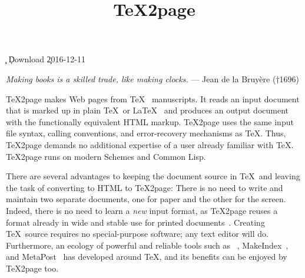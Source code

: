%




\ifx\TZPtitle\UnDeFiNeD
\def\TZPtitle{TeX2page}\fi

\title{\TeX2page}

\smallskip

\c{}
%
\ifx\inpltdist\Undefined
\ifx\shipout\UnDeFiNeD
\c{Download
}
\else
\c{2016-12-11} %
\fi
\fi
%


\ifx\shipout\UnDeFiNeD
\centerline{}
\fi

{\obeylines\raggedleft
\ifx\shipout\UnDeFiNeD\small\else\eightfont\fi
{\it Making books is a skilled trade,
like making clocks.}
— Jean de la Bruyère (†1696)
}


\medskip


\n
\TeX2page
makes Web pages
from \TeX~\cite{texbook} manuscripts.
It reads an
input document that is marked up in
plain \TeX\ or \LaTeX~\cite{latex}
and
produces an output document with the functionally
equivalent HTML markup.
\TeX2page uses the same input
file syntax, calling conventions, and  error-recovery
mechanisms as \TeX.  Thus, \TeX2page demands no additional
expertise of a user already familiar with \TeX.
\TeX2page runs on modern Schemes and Common Lisp.

There are several advantages to keeping the document
source in \TeX\ and leaving the task of converting to
HTML to \TeX2page:  There is no need to write and
maintain two separate documents, one for paper and the
other for the screen.  Indeed, there is no need to
learn a {\em new} input format, as \TeX2page reuses a
format already in wide and stable use for printed
documents~\cite{tug,ctan}.  Creating \TeX\
source requires no special-purpose software; any text
editor will do.  Furthermore, an ecology of powerful and
reliable tools such as \BibTeX~\cite{bibtex},
MakeIndex~\cite{makeindex}, and
MetaPost~\cite{metapost,mfbook} has developed around \TeX, and
its benefits can be enjoyed by \TeX2page too.

